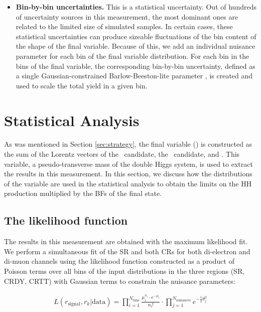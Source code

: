 \begin{itemize}
\item{\bf Bin-by-bin uncertainties.} 
This is a statistical uncertainty. Out of hundreds of uncertainty sources in this measurement, the most dominant ones are related to the limited size of simulated samples. In certain cases, these statistical uncertainties can produce sizeable fluctuations of the bin content of the shape of the final variable. Because of this, we add an individual nuisance parameter for each bin of the final variable distribution. For each bin in the bins of the final variable, the corresponding bin-by-bin uncertainty, defined as a single Gaussian-constrained Barlow-Beeston-lite parameter \cite{Barlow-Beeston, autoMCStats}, is created and used to scale the total yield in a given bin.

\end{itemize}

\section{Statistical Analysis}
\label{sec:statistics}

As was mentioned in Section \ref{sec:strategy}, the final variable (\mTHH) is constructed as the sum of the Lorentz vectors of the \Zll ~candidate, the \HBB~candidate, and \PTslash. This variable, a pseudo-transverse mass of the double Higgs system, is used to extract the results in this measurement. In this section, we discuss how the distributions of the \mTHH variable are used in the statistical analysis to obtain the limits on the HH production multiplied by the BFs of the final state.

\subsection{The likelihood function}
\label{sec:likelihood}

The results in this measurement are obtained with the maximum likelihood fit. We perform a simultaneous fit of the SR and both CRs for both di-electron and di-muon channels using the likelihood function constructed as a product of Poisson terms over all bins of the input \mTHH distributions in the three regions (SR, CRDY, CRTT) with Gaussian terms to constrain the nuisance parameters:

\begin{align*}
L(r_{\text{signal}}, r_{k}|\text{data}) = \prod_{i=1}^{N_{\mathrm{bins}}}\frac{\mu_{i}^{n_{i}}\cdot e^{-\mu_{i}}}{n_{i}!}
\cdot \prod_{j=1}^{N_{\mathrm{nuisances}}} e^{-\frac{1}{2}\theta_{j}^{2}}
\end{align*}

